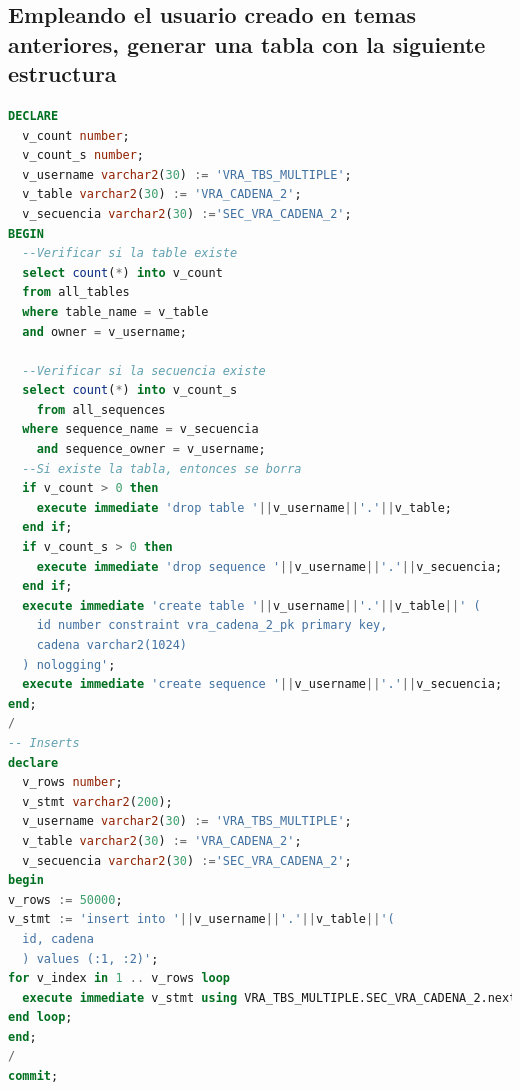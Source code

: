 \documentclass[journal]{IEEEtran}
\begin{document}
\subsection{Empleando el usuario creado en temas anteriores, generar una tabla con la siguiente estructura}
\begin{lstlisting}[language=sql, caption=sentencia crear tabla,label={lst:codigo6}]
  DECLARE
  v_count number;
  v_count_s number;
  v_username varchar2(30) := 'VRA_TBS_MULTIPLE';
  v_table varchar2(30) := 'VRA_CADENA_2';
  v_secuencia varchar2(30) :='SEC_VRA_CADENA_2';
BEGIN
  --Verificar si la table existe
  select count(*) into v_count
  from all_tables
  where table_name = v_table
  and owner = v_username;

  --Verificar si la secuencia existe
  select count(*) into v_count_s
    from all_sequences
  where sequence_name = v_secuencia
    and sequence_owner = v_username;
  --Si existe la tabla, entonces se borra
  if v_count > 0 then
    execute immediate 'drop table '||v_username||'.'||v_table;
  end if;
  if v_count_s > 0 then
    execute immediate 'drop sequence '||v_username||'.'||v_secuencia;
  end if;
  execute immediate 'create table '||v_username||'.'||v_table||' (
    id number constraint vra_cadena_2_pk primary key,
    cadena varchar2(1024)
  ) nologging';
  execute immediate 'create sequence '||v_username||'.'||v_secuencia;
end;
/
-- Inserts
declare
  v_rows number;
  v_stmt varchar2(200);
  v_username varchar2(30) := 'VRA_TBS_MULTIPLE';
  v_table varchar2(30) := 'VRA_CADENA_2';
  v_secuencia varchar2(30) :='SEC_VRA_CADENA_2';
begin
v_rows := 50000;
v_stmt := 'insert into '||v_username||'.'||v_table||'(
  id, cadena
  ) values (:1, :2)';
for v_index in 1 .. v_rows loop
  execute immediate v_stmt using VRA_TBS_MULTIPLE.SEC_VRA_CADENA_2.nextval, dbms_random.string('P',1024);
end loop;
end;
/
commit;
\end{lstlisting}
\end{document}
